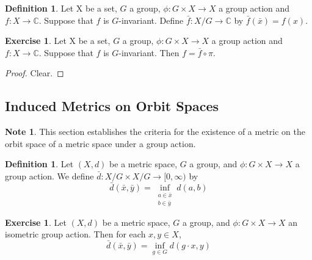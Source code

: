 \documentclass[12pt]{amsart}
\theoremstyle{definition}
\newtheorem{defn}[definition]{Definition}
\newtheorem{note}[definition]{Note}
\newtheorem{ex}[definition]{Exercise}
\newcommand{\C}{\mathbb{C}}
\newcommand{\Rg}{[0,\infty)}
\DeclareMathOperator*{\0}{\mbf{0}}
\DeclareMathOperator*{\1}{\mbf{1}}
\newcommand{\lex}[1]{\label{ex:#1}}
\newcommand{\ld}[1]{\label{defn:#1}}
\begin{document}
	\begin{defn}
	Let X be a set, $G$ a group, $\phi: G \times X \rightarrow X$ a group action and $f:X \rightarrow \C$. Suppose that $f$ is $G$-invariant. Define $\bar{f}:X/ G \rightarrow \C$ by $\bar{f}(\bar{x}) = f(x)$. 
	\end{defn}
	
	\begin{ex}
	Let X be a set, $G$ a group, $\phi: G \times X \rightarrow X$ a group action and $f:X \rightarrow \C$. Suppose that $f$ is $G$-invariant. Then $f = \bar{f} \circ \pi$. 
	\end{ex}
	
	\begin{proof}
	Clear.
	\end{proof}
	
	
	
	
	
	
	
	
	
	\newpage
	\subsection{Induced Metrics on Orbit Spaces}
	
	\begin{note}
	This section establishes the criteria for the existence of a metric on the orbit space of a metric space under a group action. 
	\end{note}
	
	\begin{defn} \ld{}
	Let $(X, d)$ be a metric space, $G$ a group, and $\phi: G \times X \rightarrow X$ a group action. We define 
	$\bar{d}: X/G \times X / G \rightarrow \Rg$ by 
	$$\bar{d}(\bar{x}, \bar{y}) = \inf_{\substack{a \in \bar{x} \\ b \in \bar{y}}} d(a,b) $$
	\end{defn}
	
	\begin{ex} \lex{}
	Let $(X, d)$ be a metric space, $G$ a group, and $\phi: G \times X \rightarrow X$ an isometric group action. Then for each $x, y \in X$, $$\bar{d}(\bar{x}, \bar{y}) = \inf_{g \in G} d(g \cdot x, y)$$
	\end{ex}
	
\end{document}
